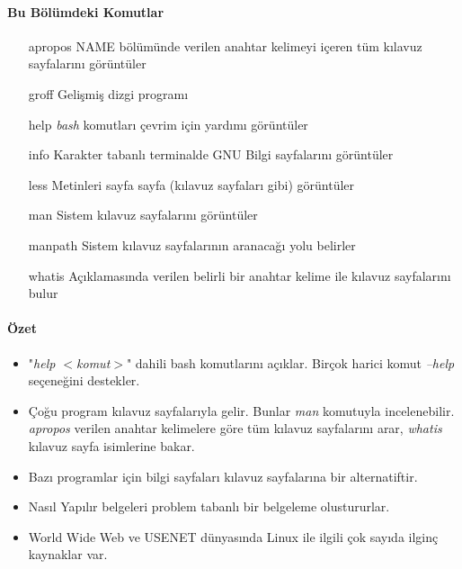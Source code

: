\paragraph{Bu Bölümdeki Komutlar}{
\begin{itemize}
\item[apropos] NAME bölümünde verilen anahtar kelimeyi içeren tüm kılavuz sayfalarını görüntüler
\item[groff] Gelişmiş dizgi programı
\item[help]	\emph{bash} komutları çevrim için yardımı görüntüler
\item[info] Karakter tabanlı terminalde GNU Bilgi sayfalarını görüntüler
\item[less] Metinleri sayfa sayfa (kılavuz sayfaları gibi) görüntüler
\item[man] Sistem kılavuz sayfalarını görüntüler
\item[manpath] Sistem kılavuz sayfalarının aranacağı yolu belirler
\item[whatis] Açıklamasında verilen belirli bir anahtar kelime ile kılavuz sayfalarını bulur
\end{itemize}
}
\paragraph{Özet}{
\begin{itemize}
\item "\emph{help $<$komut$>$}" dahili bash komutlarını açıklar. Birçok harici komut \emph{--help} seçeneğini destekler.
\item Çoğu program kılavuz sayfalarıyla gelir. Bunlar \emph{man} komutuyla incelenebilir. \emph{apropos} verilen anahtar kelimelere göre tüm kılavuz sayfalarını arar, \emph{whatis} kılavuz sayfa isimlerine bakar.
\item Bazı programlar için bilgi sayfaları kılavuz sayfalarına bir alternatiftir.
\item Nasıl Yapılır belgeleri problem tabanlı bir belgeleme olustururlar.
\item World Wide Web ve USENET dünyasında Linux ile ilgili çok sayıda ilginç kaynaklar var.
\end{itemize}}
